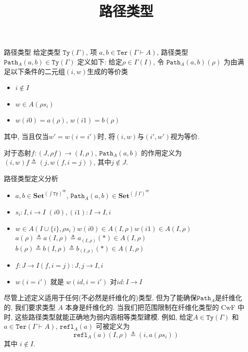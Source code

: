 \documentclass[aspectratio=169,xcolor=dvipsnames]{beamer}
\title{路径类型}
\date{}
\newcommand\Ty{\mathtt{Ty}}
\newcommand\Ter{\mathtt{Ter}}
\newcommand\Path{\mathtt{Path}}
\newcommand\Set{\mathbf{Set}}
\newcommand\refl{\mathtt{refl}}
\begin{document}
\begin{frame}
    \titlepage
\end{frame}

\begin{frame}[shrink]{路径类型}
给定类型 $\Ty(\Gamma)$, 项 $a,b\in\Ter(\Gamma\vdash A)$, 路径类型$\Path_{A}(a,b)\in\Ty(\Gamma)$ 定义如下: 给定$\rho\in\Gamma(I)$, 令 $\Path_{A}(a,b)(\rho)$ 为由满足以下条件的二元组$(i,w)$生成的等价类
\begin{itemize}
  \item $i\notin I$
  \item $w\in A(\rho s_{i})$
  \item $w(i0)=a(\rho)$, $w(i1)=b(\rho)$
\end{itemize}
其中, 当且仅当$w'=w(i=i')$时, 将$(i,w)$与$(i',w')$视为等价.

对于态射$f:(J,\rho f)\to(I,\rho)$, $\Path_{A}(a,b)$ 的作用定义为 $(i,w)f\triangleq(j,w(f,i=j))$, 其中$j\notin J$.
\end{frame}

\begin{frame}[shrink]{路径类型定义分析}
  \begin{itemize}
    \item $a,b \in \Set^{(\int\Ty)^{op}}$, $\Path_{A}(a,b)\in\Set^{(\int\Gamma)^{op}}$
    \item $s_{i} : I,i \to I$ \quad $(i0),(i1):I\to I,i$
    \item $w\in A(I\cup\{i\},\rho s_i)$\quad $w(i0)\in A(I,\rho)$\quad $w(i1)\in A(I,\rho)$\quad $a(\rho)\triangleq a(I,\rho)\triangleq a_{(I,\rho)}(\ast)\in A(I,\rho)$\quad $b(\rho)\triangleq b(I,\rho)\triangleq b_{(I,\rho)}(\ast)\in A(I,\rho)$
    \item $f:J\to I$\quad $(f,i=j) : J,j\to I,i$
    \item $w(i=i')$ 就是 $w(id,i=i')$ 对$id:I\to I$
  \end{itemize}

尽管上述定义适用于任何(不必然是纤维化的)类型, 但为了能确保$\Path_{A}$是纤维化的, 我们要求类型 $A$ 本身是纤维化的. 当我们把范围限制在纤维化类型的 CwF 中时, 这些路径类型就能正确地为弱内涵相等类型建模. 例如, 给定$A\in\Ty(\Gamma)$ 和 $a\in\Ter(\Gamma\vdash A)$, $\refl_{A}(a)$ 可被定义为
\[ \refl_{A}(a)(I,\rho)\triangleq (i,a(\rho s_i))\]
其中 $i\notin I$.
\end{frame}
\end{document}
